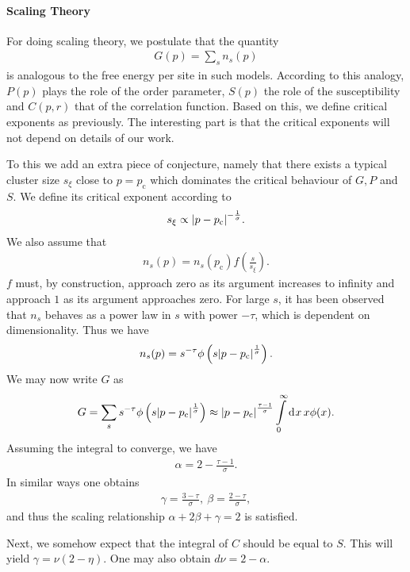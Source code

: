 \paragraph{Scaling Theory}
For doing scaling theory, we postulate that the quantity
\begin{align*}
	G(p) = \sum\limits_{s}n_{s}(p)
\end{align*}
is analogous to the free energy per site in such models. According to this analogy, $P(p)$ plays the role of the order parameter, $S(p)$ the role of the susceptibility and $C(p, r)$ that of the correlation function. Based on this, we define critical exponents as previously. The interesting part is that the critical exponents will not depend on details of our work.

To this we add an extra piece of conjecture, namely that there exists a typical cluster size $s_{\xi}$ close to $p = p_{\text{c}}$ which dominates the critical behaviour of $G, P$ and $S$. We define its critical exponent according to
\begin{align*}
	s_{\xi} \propto \abs{p - p_{\text{c}}}^{-\frac{1}{\sigma}}.
\end{align*}
We also assume that
\begin{align*}
	n_{s}(p) = n_{s}(p_{\text{c}})f\left(\frac{s}{s_{\xi}}\right).
\end{align*}
$f$ must, by construction, approach zero as its argument increases to infinity and approach $1$ as its argument approaches zero. For large $s$, it has been observed that $n_{s}$ behaves as a power law in $s$ with power $-\tau$, which is dependent on dimensionality. Thus we have
\begin{align*}
	n_{s}(p) = s^{-\tau}\phi\left(s\abs{p - p_{\text{c}}}^{\frac{1}{\sigma}}\right).
\end{align*}
We may now write $G$ as
\begin{align*}
	G = \sum\limits_{s}s^{-\tau}\phi\left(s\abs{p - p_{\text{c}}}^{\frac{1}{\sigma}}\right) \approx \abs{p - p_{\text{c}}}^{\frac{\tau - 1}{\sigma}}\int\limits_{0}^{\infty}\dd[]{x}x\phi(x).
\end{align*}
Assuming the integral to converge, we have
\begin{align*}
	\alpha = 2 - \frac{\tau - 1}{\sigma}.
\end{align*}
In similar ways one obtains
\begin{align*}
	\gamma = \frac{3 - \tau}{\sigma},\ \beta = \frac{2 - \tau}{\sigma},
\end{align*}
and thus the scaling relationship $\alpha + 2\beta + \gamma = 2$ is satisfied.

Next, we somehow expect that the integral of $C$ should be equal to $S$. This will yield $\gamma = \nu(2 - \eta)$. One may also obtain $d\nu = 2 - \alpha$.